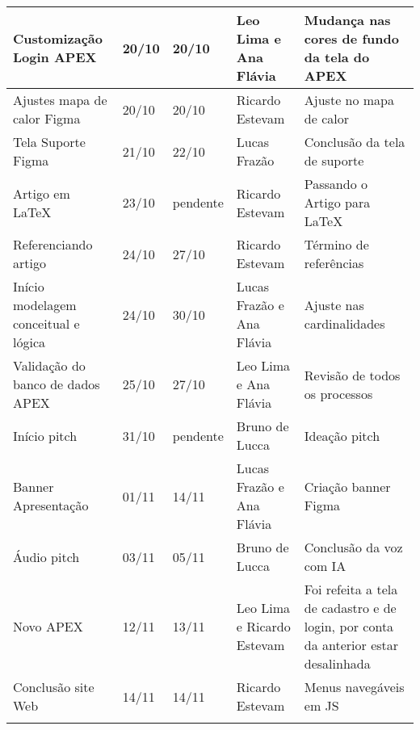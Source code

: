 \documentclass[
landscape,
  a4paper,%
  12pt,%
  english,%
  brazilian,%
]{article}
\begin{document}
\begin{table}[]
{\begin{tabular}{|l|l|l|l|l|}
Customização Login APEX             & 20/10 & 20/10 & Leo Lima e Ana Flávia & Mudança nas cores de fundo da tela do APEX \\ \hline
Ajustes mapa de calor Figma         & 20/10 & 20/10 & Ricardo Estevam & Ajuste no mapa de calor \\ \hline
Tela Suporte Figma                  & 21/10 & 22/10 & Lucas Frazão & Conclusão da tela de suporte \\ \hline
Artigo em LaTeX                     & 23/10 & pendente & Ricardo Estevam & Passando o Artigo para LaTeX \\ \hline
Referenciando artigo                & 24/10 & 27/10 & Ricardo Estevam & Término de referências \\ \hline
Início modelagem conceitual e lógica& 24/10 & 30/10 & Lucas Frazão e Ana Flávia & Ajuste nas cardinalidades \\ \hline
Validação do banco de dados APEX    & 25/10 & 27/10 & Leo Lima e Ana Flávia & Revisão de todos os processos \\ \hline
Início pitch                        & 31/10 & pendente & Bruno de Lucca & Ideação pitch \\ \hline
Banner Apresentação                 & 01/11 & 14/11 & Lucas Frazão e Ana Flávia & Criação banner Figma \\ \hline
Áudio pitch                         & 03/11 & 05/11 & Bruno de Lucca & Conclusão da voz com IA \\ \hline
Novo APEX                           & 12/11 & 13/11 & Leo Lima e Ricardo Estevam & Foi refeita a tela de cadastro e de login, por conta da anterior estar desalinhada \\ \hline
Conclusão site Web                  & 14/11 & 14/11 & Ricardo Estevam & Menus navegáveis em JS \\ \hline
                                    &       &       &                 &  \\ \hline
\end{tabular}
}
\end{table}
\end{document}
